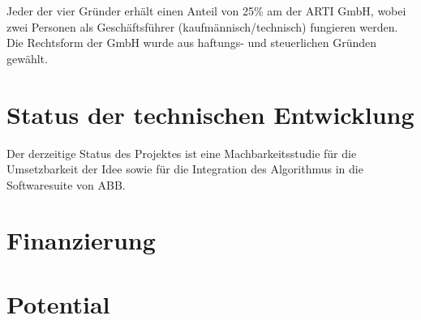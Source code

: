 Jeder der vier Gründer erhält einen Anteil von 25\% am der ARTI GmbH, wobei zwei Personen als Geschäftsführer (kaufmännisch/technisch) fungieren werden. Die Rechtsform der GmbH wurde aus haftungs- und steuerlichen Gründen gewählt.


\section{Status der technischen Entwicklung}

Der derzeitige Status des Projektes ist eine Machbarkeitsstudie für die Umsetzbarkeit der Idee sowie für die Integration des Algorithmus in die Softwaresuite von ABB.

\section{Finanzierung}



\section{Potential}

 

\blindtext
\newpage
\blindtext
